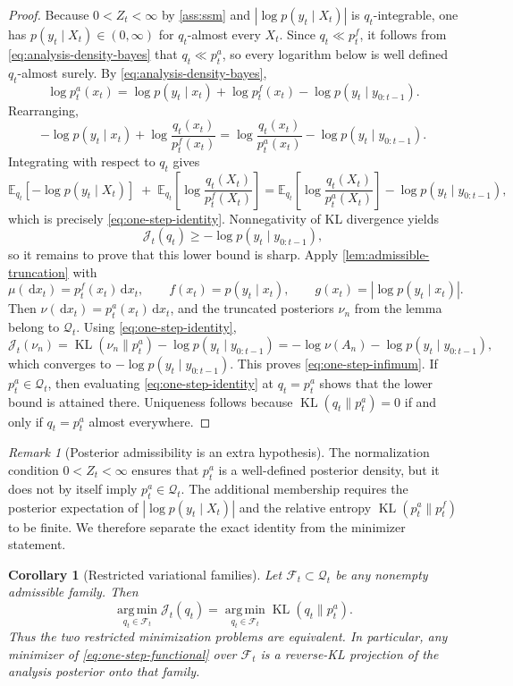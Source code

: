 \documentclass[11pt]{article}
\newcommand{\E}{\mathbb{E}}
\newcommand{\KL}{\operatorname{KL}}
\newcommand{\dd}{\,\mathrm d}
\newcommand{\argmin}{\operatorname*{arg\,min}}
\newcommand{\abs}[1]{\left\lvert #1 \right\rvert}
\newcommand{\bracks}[1]{\left[ #1 \right]}
\newcommand{\mc}{\mathcal}
\numberwithin{equation}{section}
\theoremstyle{plain}
\newtheorem{corollary}[theorem]{Corollary}
\theoremstyle{definition}
\theoremstyle{remark}
\newtheorem{remark}[theorem]{Remark}
\begin{document}
\begin{proof}
Because $0<Z_t<\infty$ by \cref{ass:ssm} and $\abs{\log p(y_t\mid X_t)}$ is $q_t$-integrable, one has $p(y_t\mid X_t)\in(0,\infty)$ for $q_t$-almost every $X_t$. Since $q_t\ll p_t^f$, it follows from \cref{eq:analysis-density-bayes} that $q_t\ll p_t^a$, so every logarithm below is well defined $q_t$-almost surely.
By \cref{eq:analysis-density-bayes},
\[
\log p_t^a(x_t)
=
\log p(y_t\mid x_t) + \log p_t^f(x_t) - \log p(y_t\mid y_{0:t-1}).
\]
Rearranging,
\[
-\log p(y_t\mid x_t) + \log \frac{q_t(x_t)}{p_t^f(x_t)}
=
\log \frac{q_t(x_t)}{p_t^a(x_t)} - \log p(y_t\mid y_{0:t-1}).
\]
Integrating with respect to $q_t$ gives
\[
\E_{q_t}\!\bracks{-\log p(y_t\mid X_t)}
\;+\;
\E_{q_t}\!\left[\log \frac{q_t(X_t)}{p_t^f(X_t)}\right]
=
\E_{q_t}\!\left[\log \frac{q_t(X_t)}{p_t^a(X_t)}\right]
-\log p(y_t\mid y_{0:t-1}),
\]
which is precisely \cref{eq:one-step-identity}. Nonnegativity of KL divergence yields
\[
\mc J_t(q_t)\ge -\log p(y_t\mid y_{0:t-1}),
\]
so it remains to prove that this lower bound is sharp. Apply \cref{lem:admissible-truncation} with
\[
\mu(\dd x_t)=p_t^f(x_t)\dd x_t,
\qquad
f(x_t)=p(y_t\mid x_t),
\qquad
g(x_t)=\abs{\log p(y_t\mid x_t)}.
\]
Then $\nu(\dd x_t)=p_t^a(x_t)\dd x_t$, and the truncated posteriors $\nu_n$ from the lemma belong to $\mc Q_t$. Using \cref{eq:one-step-identity},
\[
\mc J_t(\nu_n)
=
\KL(\nu_n\|p_t^a)-\log p(y_t\mid y_{0:t-1})
=
-\log \nu(A_n)-\log p(y_t\mid y_{0:t-1}),
\]
which converges to $-\log p(y_t\mid y_{0:t-1})$. This proves \cref{eq:one-step-infimum}. If $p_t^a\in\mc Q_t$, then evaluating \cref{eq:one-step-identity} at $q_t=p_t^a$ shows that the lower bound is attained there. Uniqueness follows because $\KL(q_t\|p_t^a)=0$ if and only if $q_t=p_t^a$ almost everywhere.
\end{proof}

\begin{remark}[Posterior admissibility is an extra hypothesis]
\label{rem:one-step-admissibility}
The normalization condition $0<Z_t<\infty$ ensures that $p_t^a$ is a well-defined posterior density, but it does not by itself imply $p_t^a\in\mc Q_t$. The additional membership requires the posterior expectation of $\abs{\log p(y_t\mid X_t)}$ and the relative entropy $\KL(p_t^a\|p_t^f)$ to be finite. We therefore separate the exact identity from the minimizer statement.
\end{remark}

\begin{corollary}[Restricted variational families]
\label{cor:one-step-restricted}
Let $\mc F_t\subset\mc Q_t$ be any nonempty admissible family. Then
\begin{equation}
\argmin_{q_t\in \mc F_t} \mc J_t(q_t)
=
\argmin_{q_t\in \mc F_t} \KL(q_t\|p_t^a).
\end{equation}
Thus the two restricted minimization problems are equivalent. In particular, any minimizer of \cref{eq:one-step-functional} over $\mc F_t$ is a reverse-KL projection of the analysis posterior onto that family.
\end{corollary}
\end{document}
